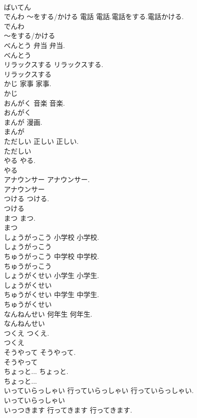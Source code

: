 \documentclass[8pt]{extreport}
\begin{document}
\begin{CJK}{UTF8}{min}
\\	ばいてん
\\	でんわ ～をする/かける	電話	電話.電話をする.電話かける.	
\\	でんわ
\\	～をする/かける
\\	べんとう	弁当	弁当.	
\\	べんとう
\\	リラックスする		リラックスする.	
\\	リラックスする
\\	かじ	家事	家事.	
\\	かじ
\\	おんがく	音楽	音楽.	
\\	おんがく
\\	まんが		漫画.	
\\	まんが
\\	ただしい	正しい	正しい.	
\\	ただしい
\\	やる		やる.	
\\	やる
\\	アナウンサー		アナウンサー.	
\\	アナウンサー
\\	つける		つける.	
\\	つける
\\	まつ		まつ.	
\\	まつ
\\	しょうがっこう	小学校	小学校.	
\\	しょうがっこう
\\	ちゅうがっこう	中学校	中学校.	
\\	ちゅうがっこう
\\	しょうがくせい	小学生	小学生.	
\\	しょうがくせい
\\	ちゅうがくせい	中学生	中学生.	
\\	ちゅうがくせい
\\	なんねんせい	何年生	何年生.	
\\	なんねんせい
\\	つくえ		つくえ.	
\\	つくえ
\\	そうやって		そうやって.	
\\	そうやって
\\	ちょっと...		ちょっと.	
\\	ちょっと...
\\	いっていらっしゃい	行っていらっしゃい	行っていらっしゃい.	
\\	いっていらっしゃい
\\	いっつきます	行ってきます	行ってきます.	

\end{CJK}
\end{document}
